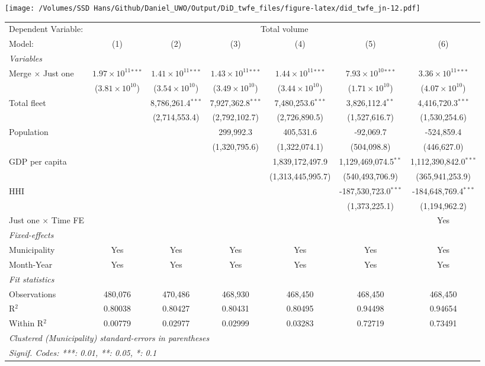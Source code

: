 \documentclass[
]{article}
\begin{document}
\texttt{[image: /Volumes/SSD Hans/Github/Daniel\_UWO/Output/DiD\_twfe\_files/figure-latex/did\_twfe\_jn-12.pdf]}

\begin{tabular}{lcccccc}
\tabularnewline\midrule\midrule
Dependent Variable:&\multicolumn{6}{c}{Total volume}\\
Model:&(1) & (2) & (3) & (4) & (5) & (6)\\
\midrule \emph{Variables}&   &   &   &   &   &  \\
Merge $\times $ Just one & $1.97\times 10^{11}$$^{***}$ & $1.41\times 10^{11}$$^{***}$ & $1.43\times 10^{11}$$^{***}$ & $1.44\times 10^{11}$$^{***}$ & $7.93\times 10^{10}$$^{***}$ & $3.36\times 10^{11}$$^{***}$\\
  &($3.81\times 10^{10}$) & ($3.54\times 10^{10}$) & ($3.49\times 10^{10}$) & ($3.44\times 10^{10}$) & ($1.71\times 10^{10}$) & ($4.07\times 10^{10}$)\\
Total fleet &    & 8,786,261.4$^{***}$ & 7,927,362.8$^{***}$ & 7,480,253.6$^{***}$ & 3,826,112.4$^{**}$ & 4,416,720.3$^{***}$\\
  &   & (2,714,553.4) & (2,792,102.7) & (2,726,890.5) & (1,527,616.7) & (1,530,254.6)\\
Population &    &    & 299,992.3 & 405,531.6 & -92,069.7 & -524,859.4\\
  &   &    & (1,320,795.6) & (1,322,074.1) & (504,098.8) & (446,627.0)\\
GDP per capita &    &    &    & 1,839,172,497.9 & 1,129,469,074.5$^{**}$ & 1,112,390,842.0$^{***}$\\
  &   &    &    & (1,313,445,995.7) & (540,493,706.9) & (365,941,253.9)\\
HHI &    &    &    &    & -187,530,723.0$^{***}$ & -184,648,769.4$^{***}$\\
  &   &    &    &    & (1,373,225.1) & (1,194,962.2)\\
Just one $\times$ Time FE &  &  &  &  &  & Yes\\
\midrule \emph{Fixed-effects}&   &   &   &   &   &  \\
Municipality & Yes & Yes & Yes & Yes & Yes & Yes\\
Month-Year & Yes & Yes & Yes & Yes & Yes & Yes\\
\midrule \emph{Fit statistics}&  & & & & & \\
Observations & 480,076&470,486&468,930&468,450&468,450&468,450\\
R$^2$ & 0.80038&0.80427&0.80431&0.80495&0.94498&0.94654\\
Within R$^2$ & 0.00779&0.02977&0.02999&0.03283&0.72719&0.73491\\
\midrule\midrule\multicolumn{7}{l}{\emph{Clustered (Municipality) standard-errors in parentheses}}\\
\multicolumn{7}{l}{\emph{Signif. Codes: ***: 0.01, **: 0.05, *: 0.1}}\\
\end{tabular}
\end{document}
